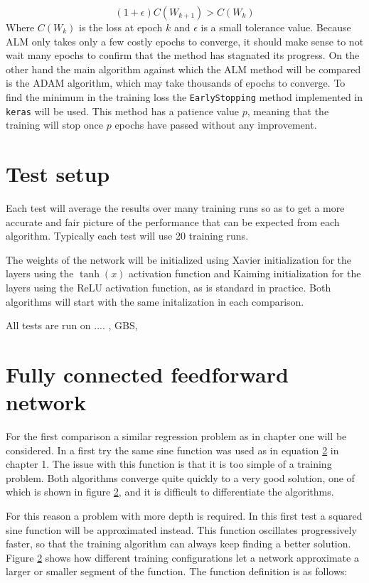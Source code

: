 \begin{equation}
(1+\epsilon)C(W_{k+1}) > C(W_k)
\end{equation}
Where $C(W_k)$ is the loss at epoch $k$ and $\epsilon$ is a small tolerance value. Because ALM only takes only a few costly epochs to converge, it should make sense to not wait many epochs to confirm that the method has stagnated its progress. On the other hand the main algorithm against which the ALM method will be compared is the ADAM algorithm, which may take thousands of epochs to converge. To find the minimum in the training loss the \texttt{EarlyStopping} method implemented in \texttt{keras} will be used. This method has a patience value $p$, meaning that the training will stop once $p$ epochs have passed without any improvement.
 

\section{Test setup}
Each test will average the results over many training runs so as to get a more accurate and fair picture of the performance that can be expected from each algorithm. Typically each test will use 20 training runs.

The weights of the network will be initialized using Xavier initialization for the layers using the $\tanh(x)$ activation function and Kaiming initialization for the layers using the ReLU activation function, as is standard in practice. Both algorithms will start with the same initalization in each comparison.

All tests are run on .... , GBS,

\section{Fully connected feedforward network}
For the first comparison a similar regression problem as in chapter one will be considered. In a first try the same sine function was used as in equation \ref{} in chapter 1. The issue with this function is that it is too simple of a training problem. Both algorithms converge quite quickly to a very good solution, one of which is shown in figure \ref{}, and it is difficult to differentiate the algorithms. 

For this reason a problem with more depth is required. In this first test a squared sine function will be approximated instead. This function oscillates progressively faster, so that the training algorithm can always keep finding a better solution. Figure \ref{} shows how different training configurations let a network approximate a larger or smaller segment of the function. The function definition is as follows:

